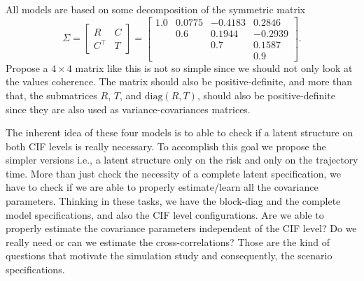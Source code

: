 All models are based on some decomposition of the symmetric matrix
\[
 \Sigma = \begin{bmatrix} R & C\\ C^{\top} & T \end{bmatrix}
        = \begin{bmatrix}
            1.0    &  0.0775 & -0.4183 &  0.2846\\
                   &  0.6    &  0.1944 & -0.2939\\
                   &         &  0.7    &  0.1587\\
                   &         &         &  0.9
          \end{bmatrix}.
\]
Propose a \(4\times4\) matrix like this is not so simple since we should
not only look at the values coherence. The matrix should also be
positive-definite, and more than that, the submatrices \(R\), \(T\),
and \(\text{diag}(R, T)\), should also be positive-definite since they
are also used as variance-covariances matrices.

The inherent idea of these four models is to able to check if a latent
structure on both CIF levels is really necessary. To accomplish this
goal we propose the simpler versions i.e., a latent structure only on
the risk and only on the trajectory time. More than just check the
necessity of a complete latent specification, we have to check if we are
able to properly estimate/learn all the covariance parameters. Thinking
in these tasks, we have the block-diag and the complete model
specifications, and also the CIF level configurations. Are we able to
properly estimate the covariance parameters independent of the CIF
level? Do we really need or can we estimate the cross-correlations?
Those are the kind of questions that motivate the simulation study and
consequently, the scenario specifications.

